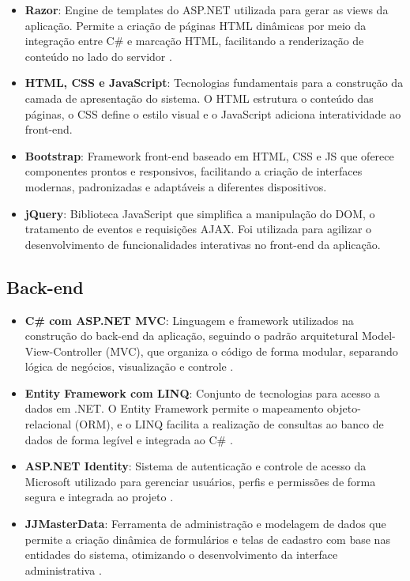 \documentclass[
	12pt,				%
	openany,			%
	twoside,			%
	a4paper,			%
	english,			%
	brazil				%
	]{abntex2}
\begin{document}
\begin{itemize}

   \item \textbf{Razor}: Engine de templates do ASP.NET utilizada para gerar as views da aplicação. Permite a criação de páginas HTML dinâmicas por meio da integração entre C\# e marcação HTML, facilitando a renderização de conteúdo no lado do servidor \cite{Razor}.

   \item \textbf{HTML, CSS e JavaScript}: Tecnologias fundamentais para a construção da camada de apresentação do sistema. O HTML estrutura o conteúdo das páginas, o CSS define o estilo visual e o JavaScript adiciona interatividade ao front-end.

   \item \textbf{Bootstrap}: Framework front-end baseado em HTML, CSS e JS que oferece componentes prontos e responsivos, facilitando a criação de interfaces modernas, padronizadas e adaptáveis a diferentes dispositivos.

   \item \textbf{jQuery}: Biblioteca JavaScript que simplifica a manipulação do DOM, o tratamento de eventos e requisições AJAX. Foi utilizada para agilizar o desenvolvimento de funcionalidades interativas no front-end da aplicação.

\end{itemize}


\subsection{Back-end}

\begin{itemize}

  \item \textbf{C\# com ASP.NET MVC}: Linguagem e framework utilizados na construção do back-end da aplicação, seguindo o padrão arquitetural Model-View-Controller (MVC), que organiza o código de forma modular, separando lógica de negócios, visualização e controle \cite{AspNet2025}.

  \item \textbf{Entity Framework com LINQ}: Conjunto de tecnologias para acesso a dados em .NET. O Entity Framework permite o mapeamento objeto-relacional (ORM), e o LINQ facilita a realização de consultas ao banco de dados de forma legível e integrada ao C\# \cite{EfCore}.

  \item \textbf{ASP.NET Identity}: Sistema de autenticação e controle de acesso da Microsoft utilizado para gerenciar usuários, perfis e permissões de forma segura e integrada ao projeto \cite{Identity}.

  \item \textbf{JJMasterData}: Ferramenta de administração e modelagem de dados que permite a criação dinâmica de formulários e telas de cadastro com base nas entidades do sistema, otimizando o desenvolvimento da interface administrativa \cite{JJMasterdata}.

\end{itemize}
\end{document}
